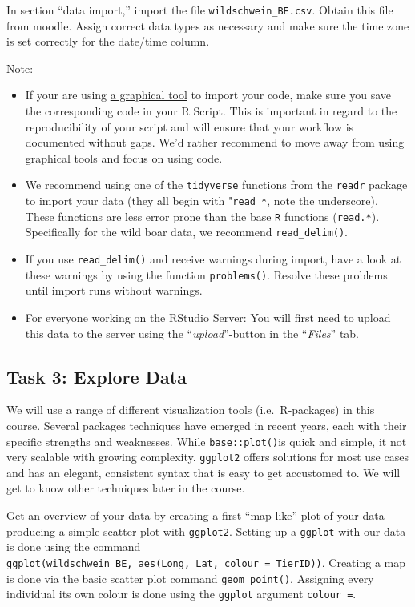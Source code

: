 \documentclass[
]{book}
\providecommand{\tightlist}{%
  \setlength{\itemsep}{0pt}\setlength{\parskip}{0pt}}
\begin{document}
In section ``data import,'' import the file \texttt{wildschwein\_BE.csv}. Obtain this file from moodle. Assign correct data types as necessary and make sure the time zone is set correctly for the date/time column.

Note:

\begin{itemize}
\tightlist
\item
  If your are using \href{https://support.rstudio.com/hc/en-us/articles/218611977-Importing-Data-with-RStudio}{a graphical tool} to import your code, make sure you save the corresponding code in your R Script. This is important in regard to the reproducibility of your script and will ensure that your workflow is documented without gaps. We'd rather recommend to move away from using graphical tools and focus on using code.
\item
  We recommend using one of the \texttt{tidyverse} functions from the \texttt{readr} package to import your data (they all begin with "\texttt{read\_*}, note the underscore). These functions are less error prone than the base \texttt{R} functions (\texttt{read.*}). Specifically for the wild boar data, we recommend \texttt{read\_delim()}.
\item
  If you use \texttt{read\_delim()} and receive warnings during import, have a look at these warnings by using the function \texttt{problems()}. Resolve these problems until import runs without warnings.
\item
  For everyone working on the RStudio Server: You will first need to upload this data to the server using the ``\emph{upload}''-button in the ``\emph{Files}'' tab.
\end{itemize}

\hypertarget{task-3-explore-data}{%
\subsection{Task 3: Explore Data}\label{task-3-explore-data}}

We will use a range of different visualization tools (i.e.~R-packages) in this course. Several packages techniques have emerged in recent years, each with their specific strengths and weaknesses. While \texttt{base::plot()}is quick and simple, it not very scalable with growing complexity. \texttt{ggplot2} offers solutions for most use cases and has an elegant, consistent syntax that is easy to get accustomed to. We will get to know other techniques later in the course.

Get an overview of your data by creating a first ``map-like'' plot of your data producing a simple scatter plot with \texttt{ggplot2}.
Setting up a \texttt{ggplot} with our data is done using the command \texttt{ggplot(wildschwein\_BE,\ aes(Long,\ Lat,\ colour\ =\ TierID))}. Creating a map is done via the basic scatter plot command \texttt{geom\_point()}.
Assigning every individual its own colour is done using the \texttt{ggplot} argument \texttt{colour\ =}.
\end{document}
